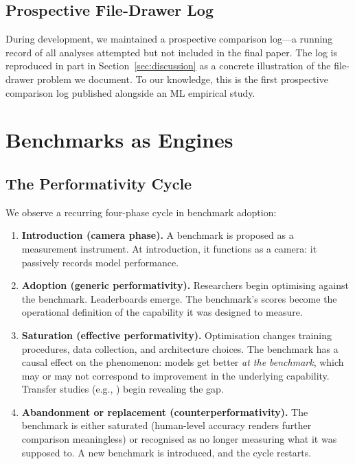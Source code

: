 \documentclass{article}
\begin{document}
\subsection{Prospective File-Drawer Log}

During development, we maintained a prospective comparison log---a running record of all analyses attempted but not included in the final paper. The log is reproduced in part in Section~\ref{sec:discussion} as a concrete illustration of the file-drawer problem we document. To our knowledge, this is the first prospective comparison log published alongside an ML empirical study.

\section{Benchmarks as Engines}
\label{sec:performativity}

\subsection{The Performativity Cycle}

We observe a recurring four-phase cycle in benchmark adoption:

\begin{enumerate}[leftmargin=*]
\item \textbf{Introduction (camera phase).} A benchmark is proposed as a measurement instrument. At introduction, it functions as a camera: it passively records model performance.
\item \textbf{Adoption (generic performativity).} Researchers begin optimising against the benchmark. Leaderboards emerge. The benchmark's scores become the operational definition of the capability it was designed to measure.
\item \textbf{Saturation (effective performativity).} Optimisation changes training procedures, data collection, and architecture choices. The benchmark has a causal effect on the phenomenon: models get better \textit{at the benchmark}, which may or may not correspond to improvement in the underlying capability. Transfer studies (e.g., \citealt{recht_imagenet_2019}) begin revealing the gap.
\item \textbf{Abandonment or replacement (counterperformativity).} The benchmark is either saturated (human-level accuracy renders further comparison meaningless) or recognised as no longer measuring what it was supposed to. A new benchmark is introduced, and the cycle restarts.
\end{enumerate}
\end{document}
